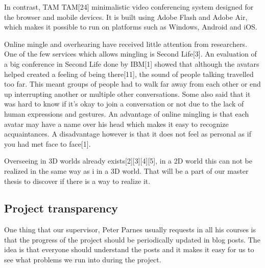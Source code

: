 \documentclass[12pt, titlepage]{article}
\begin{document}
In contrast, TAM TAM[24] minimalistic video conferencing system designed for the browser and mobile devices. It is built using Adobe Flash and Adobe Air, which makes it possible to run on platforms such as Windows, Android and iOS.

Online mingle and overhearing have received little attention from researchers. One of the few services which allows mingling is Second Life[3]. An evaluation of a big conference in Second Life done by IBM[1] showed that although the avatars helped created a feeling of being there[11], the sound of people talking travelled too far. This meant groups of people had to walk far away from each other or end up interrupting another or multiple other conversations. Some also said that it was hard to know if it’s okay to join a conversation or not due to the lack of human expressions and gestures. An advantage of online mingling is that each avatar may have a name over his head which makes it easy to recognize acquaintances. A disadvantage however is that it does not feel as personal as if you had met face to face[1].

Overseeing in 3D worlds already exists[2][3][4][5], in a 2D world this can not be realized in the same way as i in a 3D world. That will be a part of our master thesis to discover if there is a way to realize it.
\subsection{Project transparency}
One thing that our supervisor, Peter Parnes usually requests in all his courses is that the progress of the project should be periodically updated in blog posts. The idea is that everyone should understand the posts and it makes it easy for us to see what problems we run into during the project.
\end{document}
